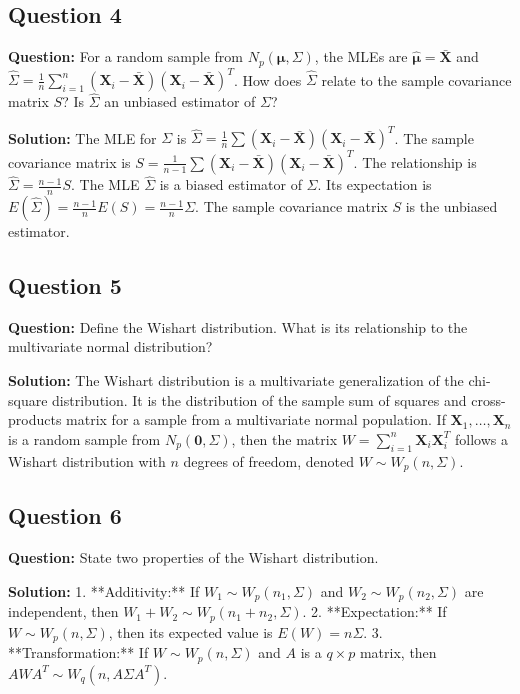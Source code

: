 \subsection*{Question 4}
\textbf{Question:} For a random sample from $N_p(\boldsymbol{\mu}, \Sigma)$, the MLEs are $\hat{\boldsymbol{\mu}} = \bar{\mathbf{X}}$ and $\hat{\Sigma} = \frac{1}{n}\sum_{i=1}^n(\mathbf{X}_i-\bar{\mathbf{X}})(\mathbf{X}_i-\bar{\mathbf{X}})^T$. How does $\hat{\Sigma}$ relate to the sample covariance matrix $S$? Is $\hat{\Sigma}$ an unbiased estimator of $\Sigma$?

\textbf{Solution:}
The MLE for $\Sigma$ is $\hat{\Sigma} = \frac{1}{n}\sum(\mathbf{X}_i-\bar{\mathbf{X}})(\mathbf{X}_i-\bar{\mathbf{X}})^T$.
The sample covariance matrix is $S = \frac{1}{n-1}\sum(\mathbf{X}_i-\bar{\mathbf{X}})(\mathbf{X}_i-\bar{\mathbf{X}})^T$.
The relationship is $\hat{\Sigma} = \frac{n-1}{n}S$.
The MLE $\hat{\Sigma}$ is a biased estimator of $\Sigma$. Its expectation is $E(\hat{\Sigma}) = \frac{n-1}{n}E(S) = \frac{n-1}{n}\Sigma$. The sample covariance matrix $S$ is the unbiased estimator.

\subsection*{Question 5}
\textbf{Question:} Define the Wishart distribution. What is its relationship to the multivariate normal distribution?

\textbf{Solution:}
The Wishart distribution is a multivariate generalization of the chi-square distribution. It is the distribution of the sample sum of squares and cross-products matrix for a sample from a multivariate normal population.
If $\mathbf{X}_1, \dots, \mathbf{X}_n$ is a random sample from $N_p(\mathbf{0}, \Sigma)$, then the matrix $W = \sum_{i=1}^n \mathbf{X}_i \mathbf{X}_i^T$ follows a Wishart distribution with $n$ degrees of freedom, denoted $W \sim W_p(n, \Sigma)$.

\subsection*{Question 6}
\textbf{Question:} State two properties of the Wishart distribution.

\textbf{Solution:}
1.  **Additivity:** If $W_1 \sim W_p(n_1, \Sigma)$ and $W_2 \sim W_p(n_2, \Sigma)$ are independent, then $W_1 + W_2 \sim W_p(n_1+n_2, \Sigma)$.
2.  **Expectation:** If $W \sim W_p(n, \Sigma)$, then its expected value is $E(W) = n\Sigma$.
3.  **Transformation:** If $W \sim W_p(n, \Sigma)$ and $A$ is a $q \times p$ matrix, then $AWA^T \sim W_q(n, A\Sigma A^T)$.

